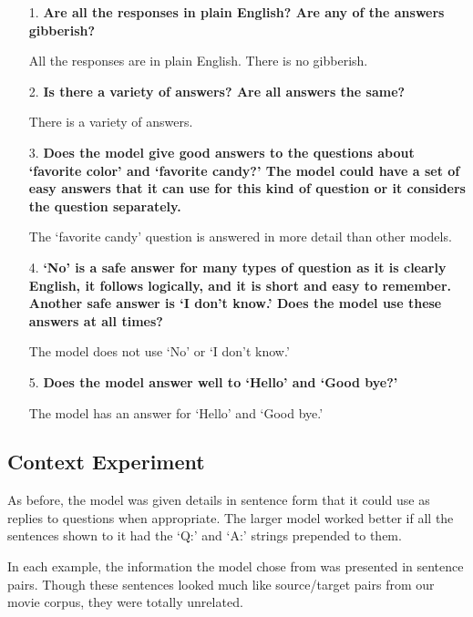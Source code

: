 \begin{itemize}
	\item [1.] \textbf{Are all the responses in plain English? Are any of the answers gibberish?}
	
	\item []All the responses are in plain English. There is no gibberish.
	
	\item [2.] \textbf{Is there a  variety of answers? Are all answers the same?}
	
	\item []There is a variety of answers. 
	
	\item [3.] \textbf{Does the model give good answers to the questions about `favorite color' and `favorite candy?' The model could have a set of easy answers that it can use for this kind of question or it considers the question separately.} 
	
	\item []The `favorite candy' question is answered in more detail than other models.
	
	\item [4.] \textbf{`No' is a safe answer for many types of question as it is clearly English, it follows logically, and it is short and easy to remember. Another safe answer is `I don't know.' Does the model use these answers at all times?}
	
	\item []The model does not use `No' or `I don't know.'
	
	\item [5.] \textbf{Does the model answer well to `Hello' and `Good bye?'}
	
	\item []The model has an answer for `Hello' and `Good bye.'
	
\end{itemize}


\subsection{Context Experiment}

As before, the model was given details in sentence form that it could use as replies to questions when appropriate. The larger model worked better if all the sentences shown to it had the `Q:' and `A:' strings prepended to them. 

In each example, the information the model chose from was presented in sentence pairs. Though these sentences looked much like source/target pairs from our movie corpus, they were totally unrelated.

